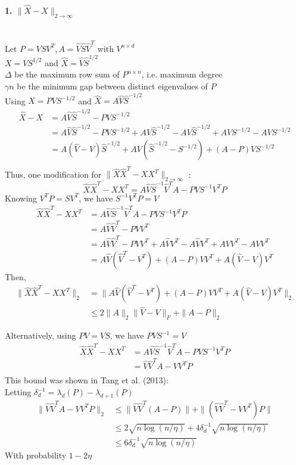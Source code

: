 \documentclass[10pt]{article}
\begin{document}
\paragraph{1. $\| \hat{X}-X\|_{2\rightarrow\infty}$}\mbox{}\\
Let $P = VSV^T, A = \hat{V}\hat{S}\hat{V}^T$ with $V^{n\times d} $\\
$ X = VS^{1/2}$ and $\hat{X} = \hat{V}\hat{S}^{1/2}$\\
$\Delta$ be the maximum row sum of $P^{n\times n}$, i.e. maximum degree\\
$\gamma n$ be the minimum gap between distinct eigenvalues of $P$\\ 
Using $X=PVS^{-1/2}$ and $\hat{X} = A\hat{V}\hat{S}^{-1/2}$\\
\begin{align*}
\hat{X}-X &= A\hat{V}\hat{S}^{-1/2} - PVS^{-1/2}\\
&= A\hat{V}\hat{S}^{-1/2} - PVS^{-1/2} + AV\hat{S}^{-1/2} - AV\hat{S}^{-1/2} +AVS^{-1/2} -AVS^{-1/2}\\
&= A(\hat{V} - V)\hat{S}^{-1/2} + AV(\hat{S}^{-1/2}-S^{-1/2}) +(A-P)VS^{-1/2}  \\
\end{align*}
Thus, one modification for $\| \hat{X}\hat{X}^T-XX^T\|_{2\rightarrow\infty}$ :
\begin{equation*}
\hat{X}\hat{X}^T-XX^T = A\hat{V}\hat{S}^{-1}\hat{V}^TA - PVS^{-1}V^TP
\end{equation*}
Knowing $V^TP = SV^T$, we have $S^{-1}V^TP = V$
\begin{align*}
\hat{X}\hat{X}^T-XX^T &=A\hat{V}\hat{S}^{-1}\hat{V}^TA - PVS^{-1}V^TP\\
&= A\hat{V}\hat{V}^T - PVV^T\\
&= A\hat{V}\hat{V}^T - PVV^T + A\hat{V}V^T - A\hat{V}V^T + AVV^T - AVV^T\\
&= A\hat{V}(\hat{V}^T - V^T) + (A-P)VV^T + A(\hat{V} - V)V^T
\end{align*}
Then,
\begin{align*}
\|\hat{X}\hat{X}^T-XX^T\|_2 &=\|A\hat{V}(\hat{V}^T - V^T) + (A-P)VV^T + A(\hat{V} - V)V^T\|_2\\
&\leq 2\|A\|_2\|\hat{V}-V\|_F + \|A-P\|_2
\end{align*}

Alternatively, using  $PV = VS$, we have $PVS^{-1} = V$
\begin{align*}
\hat{X}\hat{X}^T-XX^T &=A\hat{V}\hat{S}^{-1}\hat{V}^TA - PVS^{-1}V^TP\\
&= \hat{V}\hat{V}^TA - VV^TP\\
\end{align*}
This bound was shown in Tang et al. (2013):\\
Letting $\delta^{-1}_d = \lambda_d(P)-\lambda_{d+1}(P)$
\begin{align*}
\| \hat{V}\hat{V}^TA - VV^TP\|_2 &\leq \| \hat{V}\hat{V}^T (A-P)\| +\| (\hat{V}\hat{V}^T - VV^T)P\|\\
&\leq 2 \sqrt{n\log(n/\eta)} + 4 \delta^{-1}_d \sqrt{n\log(n/\eta)}\\
&\leq 6\delta^{-1}_d \sqrt{n\log(n/\eta)}
\end{align*}
With probability $1-2\eta$
\end{document}
